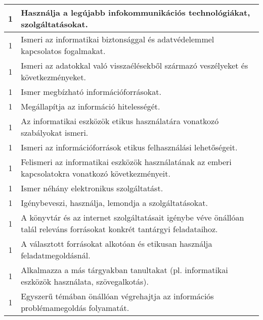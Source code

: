 \begin{longtable}{c | p{12cm} }
                                          1 &  Használja a legújabb infokommunikációs technológiákat, szolgáltatásokat. \\ \hline
                                          1 &  Ismeri az informatikai biztonsággal és adatvédelemmel kapcsolatos fogalmakat. \\ \hline
                                          1 &  Ismeri az adatokkal való visszaélésekből származó veszélyeket és következményeket. \\ \hline
                                          1 &  Ismer megbízható információforrásokat. \\ \hline
                                          1 &  Megállapítja az információ hitelességét. \\ \hline
                                          1 &  Az informatikai eszközök etikus használatára vonatkozó szabályokat ismeri. \\ \hline
                                          1 &  Ismeri az információforrások etikus felhasználási lehetőségeit. \\ \hline
                                          1 &  Felismeri az informatikai eszközök használatának az emberi kapcsolatokra vonatkozó következményeit. \\ \hline
                                          1 &  Ismer néhány elektronikus szolgáltatást. \\ \hline
                                          1 &  Igénybeveszi, használja, lemondja a szolgáltatásokat. \\ \hline
                                          1 &  A könyvtár és az internet szolgáltatásait igénybe véve önállóan talál releváns forrásokat konkrét tantárgyi feladataihoz. \\ \hline
                                          1 &  A választott forrásokat alkotóan és etikusan használja feladatmegoldásnál. \\ \hline
                                          1 &  Alkalmazza a más tárgyakban tanultakat (pl. informatikai eszközök használata, szövegalkotás). \\ \hline
                                          1 &  Egyszerű témában önállóan végrehajtja az információs problémamegoldás folyamatát. \\ \hline
                                      

\end{longtable}
